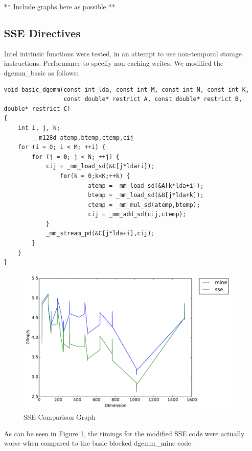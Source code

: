 \documentclass[letterpaper]{article}	 %
\begin{document}
** Include graphs here as possible **

\subsection{SSE Directives}

Intel intrinsic functions were tested, in an attempt to use non-temporal storage instructions. Performance to specify non caching writes. We modified the dgemm\_basic as follows:

\begin{verbatim}
void basic_dgemm(const int lda, const int M, const int N, const int K,
                 const double* restrict A, const double* restrict B, double* restrict C)
{
    int i, j, k;
        __m128d atemp,btemp,ctemp,cij
    for (i = 0; i < M; ++i) {
        for (j = 0; j < N; ++j) {
            cij = _mm_load_sd(&C[j*lda+i]);
                for(k = 0;k<K;++k) {
                        atemp = _mm_load_sd(&A[k*lda+i]);
                        btemp = _mm_load_sd(&B[j*lda+k]);
                        ctemp = _mm_mul_sd(atemp,btemp);
                        cij = _mm_add_sd(cij,ctemp);
            }
            _mm_stream_pd(&C[j*lda+i],cij);
        }
    }
}
\end{verbatim}

\begin{figure}[H]
\centering
  \centering
  \includegraphics[width=.6\linewidth]{timing_sse.pdf}
  \caption{SSE Comparison Graph}
  \label{fig:sse}
  \end{figure}
  
  As can be seen in Figure \ref{fig:sse}, the timings for the modified SSE code were actually worse when compared to the basic blocked dgemm\_mine code. 
\end{document}
